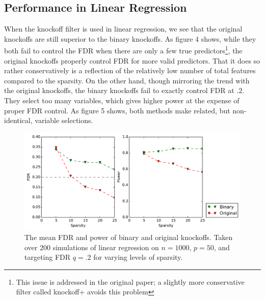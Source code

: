 \documentclass[11pt]{article}
\theoremstyle{definition}
\begin{document}
\subsection{Performance in Linear Regression} 
    \FloatBarrier
    When the knockoff filter is used in linear regression, we see that the original knockoffs are still superior to the binary knockoffs. As figure 4 shows, while they both fail to control the FDR when there are only a few true predictors\footnote{This issue is addressed in the original paper; a slightly more conservative filter called knockoff+ avoids this problem}, the original knockoffs properly control FDR for more valid predictors. That it does so rather conservatively is a reflection of the relatively low number of total features compared to the sparsity. On the other hand, though mirroring the trend with the original knockoffs, the binary knockoffs fail to exactly control FDR at $.2$. They select too many variables, which gives higher power at the expense of proper FDR control. As figure 5 shows, both methods make related, but non-identical, variable selections. \par
    
    \begin{figure}[h]
        \begin{center}
        \includegraphics[width=14cm]{images/lasso_FDR_power_50}
    \end{center}
    \caption{\linespread{1}\selectfont{}The mean FDR and power of binary and original knockoffs. Taken over $200$ simulations of linear regression on $n=1000$, $p=50$, and targeting FDR $q=.2$ for varying levels of sparsity.}  
    \end{figure}
\end{document}
